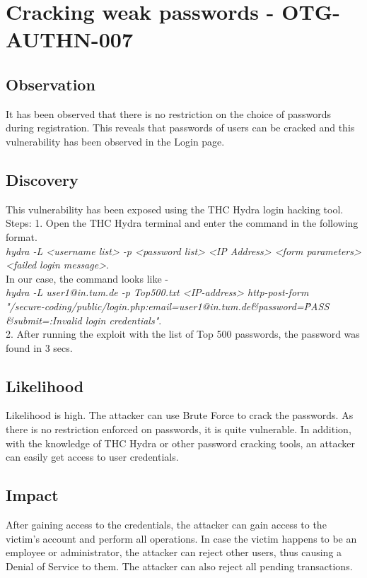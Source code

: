 \section{Cracking weak passwords - OTG-AUTHN-007}

\subsection{Observation}
It has been observed that there is no restriction on the choice of passwords during registration. This reveals that passwords of users can be cracked and this vulnerability has been observed in the Login page.

\subsection{Discovery}
This vulnerability has been exposed using the THC Hydra login hacking tool. \\
Steps: 
1. Open the THC Hydra terminal and enter the command in the following format. \\
\textit{hydra -L <username list> -p <password list> <IP Address> <form parameters><failed login message>}. \\
In our case, the command looks like - \\
\textit{hydra -L user1@in.tum.de -p Top500.txt <IP-address> http-post-form \\ "/secure-coding/public/login.php:email=user1@in.tum.de\&password=\^PASS\^ \\ \&submit=:Invalid login credentials"}. \\
2. After running the exploit with the list of Top 500 passwords, the password was found in 3 secs.

\subsection{Likelihood}
Likelihood is high.
The attacker can use Brute Force to crack the passwords. As there is no restriction enforced on passwords, it is quite vulnerable. In addition, with the knowledge of THC Hydra or other password cracking tools, an attacker can easily get access to user credentials. 

\subsection{Impact}
After gaining access to the credentials, the attacker can gain access to the victim's account and perform all operations. In case the victim happens to be an employee or administrator, the attacker can reject other users, thus causing a Denial of Service to them. The attacker can also reject all pending transactions. 

